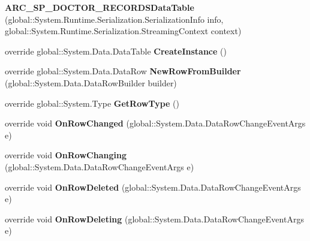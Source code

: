 \begin{CompactItemize}
\item 
\textbf{ARC\_\-SP\_\-DOCTOR\_\-RECORDSDataTable} (global::System.Runtime.Serialization.SerializationInfo info, global::System.Runtime.Serialization.StreamingContext context)\label{class_automatic_medical_system_1_1_data_set2_1_1_a_r_c___s_p___d_o_c_t_o_r___r_e_c_o_r_d_s_data_table_19e9be533adca631c6b288dc028ab66d}

\item 
override global::System.Data.DataTable \textbf{CreateInstance} ()\label{class_automatic_medical_system_1_1_data_set2_1_1_a_r_c___s_p___d_o_c_t_o_r___r_e_c_o_r_d_s_data_table_bd1aca9e70966f79dabfd1eda23bf666}

\item 
override global::System.Data.DataRow \textbf{NewRowFromBuilder} (global::System.Data.DataRowBuilder builder)\label{class_automatic_medical_system_1_1_data_set2_1_1_a_r_c___s_p___d_o_c_t_o_r___r_e_c_o_r_d_s_data_table_666feff536fb5be9b64407c3f6a23611}

\item 
override global::System.Type \textbf{GetRowType} ()\label{class_automatic_medical_system_1_1_data_set2_1_1_a_r_c___s_p___d_o_c_t_o_r___r_e_c_o_r_d_s_data_table_5c78d387b021bf428927f42ea95c0c37}

\item 
override void \textbf{OnRowChanged} (global::System.Data.DataRowChangeEventArgs e)\label{class_automatic_medical_system_1_1_data_set2_1_1_a_r_c___s_p___d_o_c_t_o_r___r_e_c_o_r_d_s_data_table_21950f3b24838968a736c9f6fc81b9af}

\item 
override void \textbf{OnRowChanging} (global::System.Data.DataRowChangeEventArgs e)\label{class_automatic_medical_system_1_1_data_set2_1_1_a_r_c___s_p___d_o_c_t_o_r___r_e_c_o_r_d_s_data_table_dc395ff8f913976bc515e255adb6b5fb}

\item 
override void \textbf{OnRowDeleted} (global::System.Data.DataRowChangeEventArgs e)\label{class_automatic_medical_system_1_1_data_set2_1_1_a_r_c___s_p___d_o_c_t_o_r___r_e_c_o_r_d_s_data_table_7021bbb57bc60f09523f8d61434e9387}

\item 
override void \textbf{OnRowDeleting} (global::System.Data.DataRowChangeEventArgs e)\label{class_automatic_medical_system_1_1_data_set2_1_1_a_r_c___s_p___d_o_c_t_o_r___r_e_c_o_r_d_s_data_table_b266461b8b4c43bb25ab0da50e81a6cf}

\end{CompactItemize}
